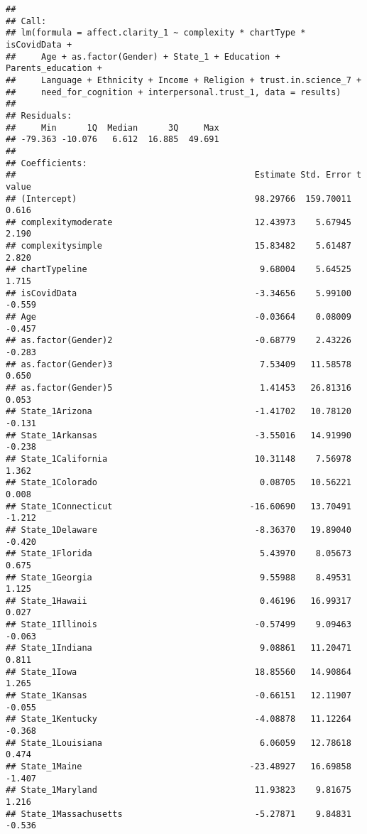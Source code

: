 \documentclass[
]{article}
\begin{document}
\begin{verbatim}
## 
## Call:
## lm(formula = affect.clarity_1 ~ complexity * chartType * isCovidData + 
##     Age + as.factor(Gender) + State_1 + Education + Parents_education + 
##     Language + Ethnicity + Income + Religion + trust.in.science_7 + 
##     need_for_cognition + interpersonal.trust_1, data = results)
## 
## Residuals:
##     Min      1Q  Median      3Q     Max 
## -79.363 -10.076   6.612  16.885  49.691 
## 
## Coefficients:
##                                               Estimate Std. Error t value
## (Intercept)                                   98.29766  159.70011   0.616
## complexitymoderate                            12.43973    5.67945   2.190
## complexitysimple                              15.83482    5.61487   2.820
## chartTypeline                                  9.68004    5.64525   1.715
## isCovidData                                   -3.34656    5.99100  -0.559
## Age                                           -0.03664    0.08009  -0.457
## as.factor(Gender)2                            -0.68779    2.43226  -0.283
## as.factor(Gender)3                             7.53409   11.58578   0.650
## as.factor(Gender)5                             1.41453   26.81316   0.053
## State_1Arizona                                -1.41702   10.78120  -0.131
## State_1Arkansas                               -3.55016   14.91990  -0.238
## State_1California                             10.31148    7.56978   1.362
## State_1Colorado                                0.08705   10.56221   0.008
## State_1Connecticut                           -16.60690   13.70491  -1.212
## State_1Delaware                               -8.36370   19.89040  -0.420
## State_1Florida                                 5.43970    8.05673   0.675
## State_1Georgia                                 9.55988    8.49531   1.125
## State_1Hawaii                                  0.46196   16.99317   0.027
## State_1Illinois                               -0.57499    9.09463  -0.063
## State_1Indiana                                 9.08861   11.20471   0.811
## State_1Iowa                                   18.85560   14.90864   1.265
## State_1Kansas                                 -0.66151   12.11907  -0.055
## State_1Kentucky                               -4.08878   11.12264  -0.368
## State_1Louisiana                               6.06059   12.78618   0.474
## State_1Maine                                 -23.48927   16.69858  -1.407
## State_1Maryland                               11.93823    9.81675   1.216
## State_1Massachusetts                          -5.27871    9.84831  -0.536

\end{verbatim}
\end{document}
